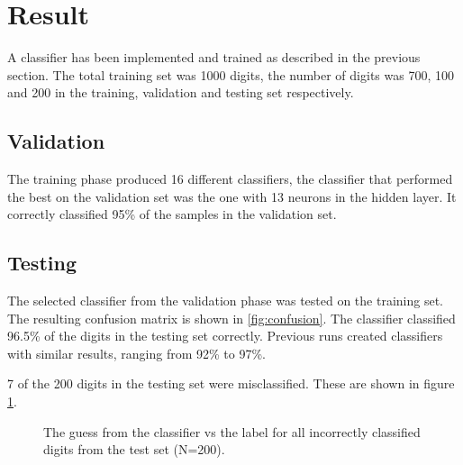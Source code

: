 \documentclass[report.tex]{subfile}
\begin{document}
\section{Result}
A classifier has been implemented and trained as described in the previous
section. The total training set was 1000 digits, the number of digits was 700,
100 and 200 in the training, validation and testing set respectively.

\subsection{Validation}
The training phase produced 16 different classifiers, the classifier that
performed the best on the validation set was the one with 13 neurons in the
hidden layer. It correctly classified 95\% of the samples in the validation
set.

\subsection{Testing}
The selected classifier from the validation phase was tested on the training
set. The resulting confusion matrix is shown in \ref{fig:confusion}. The
classifier classified 96.5\% of the digits in the testing set correctly.
Previous runs created classifiers with similar results, ranging from 92\% to
97\%.

7 of the 200 digits in the testing set were misclassified. These are shown in
figure \ref{fig:incorrect}.

\begin{figure}
    \hspace*{-2cm}
    \resizebox{1.2\textwidth}{!}{}
    \caption{The guess from the classifier vs the label for all incorrectly
    classified digits from the test set (N=200).}
    \label{fig:incorrect}
\end{figure}
\end{document}
